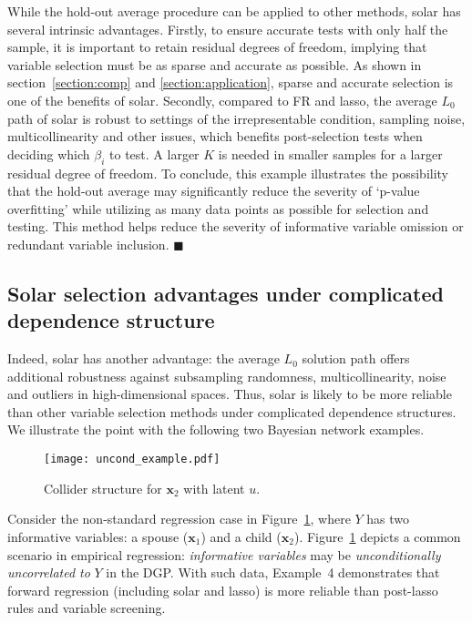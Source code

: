 \documentclass[12pt]{article}
\begin{document}
While the hold-out average procedure can be applied to other methods, solar has several intrinsic advantages. Firstly, to ensure accurate tests with only half the sample, it is important to retain residual degrees of freedom, implying that variable selection must be as sparse and accurate as possible. As shown in section~\ref{section:comp} and \ref{section:application}, sparse and accurate selection is one of the benefits of solar. Secondly, compared to FR and lasso, the average $L_0$ path of solar is robust to settings of the irrepresentable condition, sampling noise, multicollinearity and other issues, which benefits post-selection tests when deciding which $\beta_i$ to test. A larger $K$ is needed in smaller samples for a larger residual degree of freedom. To conclude, this example illustrates the possibility that the hold-out average may significantly reduce the severity of `p-value overfitting' while utilizing as many data points as possible for selection and testing. This method helps reduce the severity of informative variable omission or redundant variable inclusion. $\blacksquare$

\subsection*{Solar selection advantages under complicated dependence structure}

Indeed, solar has another advantage: the average $L_0$ solution path offers additional robustness against subsampling randomness, multicollinearity, noise and outliers in high-dimensional spaces. Thus, solar is likely to be more reliable than other variable selection methods under complicated dependence structures. We illustrate the point with the following two Bayesian network examples.

\begin{figure}[h]
%
  \centering
  \texttt{[image: uncond\_example.pdf]}
  \caption{Collider structure for $\mathbf{x}_2$ with latent $u$.}
  \label{fig:uncond_example}
%
\end{figure}

Consider the non-standard regression case in Figure~\ref{fig:uncond_example}, where $Y$ has two informative variables: a spouse ($\mathbf{x}_1$) and a child ($\mathbf{x}_2$). Figure~\ref{fig:uncond_example} depicts a common scenario in empirical regression: \emph{informative variables} may be \emph{unconditionally uncorrelated to} $Y$ in the DGP. With such data, Example~4 demonstrates that forward regression (including solar and lasso) is more reliable than post-lasso rules and variable screening.
\end{document}
